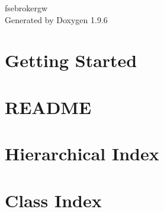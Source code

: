 \documentclass[twoside]{book}
\newcommand{\+}{\discretionary{\mbox{\scriptsize$\hookleftarrow$}}{}{}}
\newcommand{\clearemptydoublepage}{%
    \newpage{\pagestyle{empty}\cleardoublepage}%
  }
\begin{document}
  \raggedbottom
    \hypersetup{pageanchor=false,
                bookmarksnumbered=true,
                pdfencoding=unicode
               }
  \begin{titlepage}
  \vspace*{7cm}
  \begin{center}%
  {\Large fsebrokergw}\\
  \vspace*{1cm}
  {\large Generated by Doxygen 1.9.6}\\
  \end{center}
  \end{titlepage}
  \clearemptydoublepage
  \tableofcontents
  \clearemptydoublepage
  \hypersetup{pageanchor=true}
\chapter{Getting Started}
\label{md__h_e_l_p}

\chapter{README}
\label{md__r_e_a_d_m_e}

\chapter{Hierarchical Index}

\chapter{Class Index}

\end{document}
